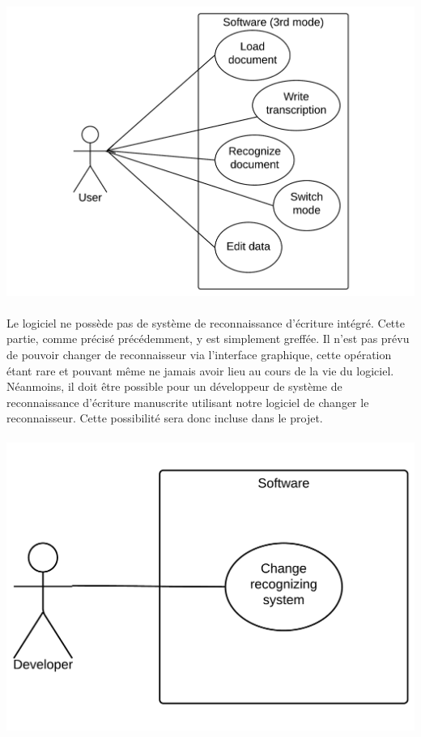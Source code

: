 \newpage

\begin{mdframed}[frametitle={Figure 4 : Diagramme de cas d'utilisation (mode production)}, innerbottommargin=10]
\begin{center}
\includegraphics[scale=0.4]{Usecase_3.pdf}
\end{center}
\end{mdframed}

\paragraph{}
Le logiciel ne possède pas de système de reconnaissance d’écriture intégré.
Cette partie, comme précisé précédemment, y est simplement greffée. Il n’est
pas prévu de pouvoir changer de reconnaisseur via l’interface graphique, cette
opération étant rare et pouvant même ne jamais avoir lieu au cours de la vie du
logiciel. Néanmoins, il doit être possible pour un développeur de système de
reconnaissance d’écriture manuscrite utilisant notre logiciel de changer le
reconnaisseur. Cette possibilité sera donc incluse dans le projet.

\paragraph{}
\begin{mdframed}[frametitle={Figure 5 : Diagramme de cas d'utilisation (pour développeur)}, innerbottommargin=10]
\begin{center}
\includegraphics[scale=0.4]{Usecase_Dev.pdf}
\end{center}
\end{mdframed}
